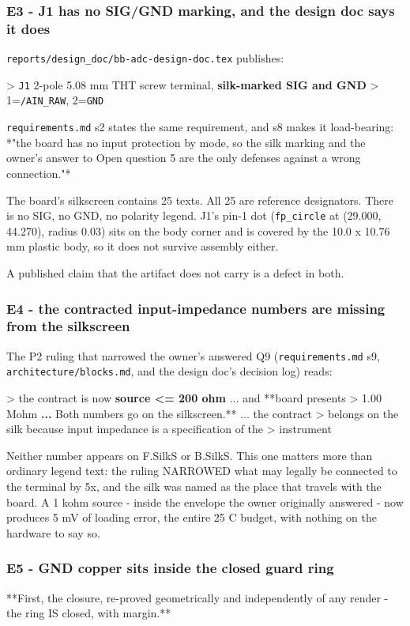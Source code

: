 \documentclass[11pt,a4paper]{article}
\begin{document}
\subsubsection*{E3 - J1 has no SIG/GND marking, and the design doc says it does}
\texttt{reports/design\_doc/bb-adc-design-doc.tex} publishes:

\textgreater{} \texttt{J1} \textbar{} 2-pole 5.08 mm THT screw terminal, \textbf{silk-marked SIG and GND} \textbar{} \textgreater{} 1=\texttt{/AIN\_RAW}, 2=\texttt{GND}

\texttt{requirements.md} s2 states the same requirement, and s8 makes it load-bearing: {*}"the board has no input protection by mode, so the silk marking and the owner's answer to Open question 5 are the only defenses against a wrong connection."{*}

The board's silkscreen contains 25 texts. All 25 are reference designators. There is no SIG, no GND, no polarity legend. J1's pin-1 dot (\texttt{fp\_circle} at (29.000, 44.270), radius 0.03) sits on the body corner and is covered by the 10.0 x 10.76 mm plastic body, so it does not survive assembly either.

A published claim that the artifact does not carry is a defect in both.

\subsubsection*{E4 - the contracted input-impedance numbers are missing from the silkscreen}
The P2 ruling that narrowed the owner's answered Q9 (\texttt{requirements.md} s9, \texttt{architecture/blocks.md}, and the design doc's decision log) reads:

\textgreater{} the contract is now \textbf{source \textless{}= 200 ohm} ... and {*}{*}board presents \textgreater{} 1.00 Mohm\textbf{ ... }Both numbers go on the silkscreen.{*}{*} ... the contract \textgreater{} belongs on the silk because input impedance is a specification of the \textgreater{} instrument

Neither number appears on F.SilkS or B.SilkS. This one matters more than ordinary legend text: the ruling NARROWED what may legally be connected to the terminal by 5x, and the silk was named as the place that travels with the board. A 1 kohm source - inside the envelope the owner originally answered - now produces 5 mV of loading error, the entire 25 C budget, with nothing on the hardware to say so.

\subsubsection*{E5 - GND copper sits inside the closed guard ring}
{*}{*}First, the closure, re-proved geometrically and independently of any render - the ring IS closed, with margin.{*}{*}
\end{document}
